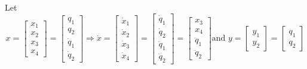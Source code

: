 \documentclass[12pt,a4paper]{article}
\begin{document}
Let 
\[
x = \begin{bmatrix}
	x_1 \\ x_2 \\ x_3 \\ x_4
\end{bmatrix} = \begin{bmatrix}
	q_1 \\ q_2 \\ \dot q_1 \\ \dot q_2
\end{bmatrix} \Rightarrow \dot x = \begin{bmatrix}
	\dot x_1 \\ \dot x_2 \\ \dot x_3 \\ \dot x_4
\end{bmatrix} = \begin{bmatrix}
\dot q_1 \\ \dot q_2 \\ \ddot q_1 \\ \ddot q_2
\end{bmatrix} = \begin{bmatrix}
x_3 \\ x_4 \\ \ddot q_1 \\ \ddot q_2
\end{bmatrix} \text{and } y = \begin{bmatrix}
y_1 \\ y_2 
\end{bmatrix} = \begin{bmatrix}
q_1 \\ q_2
\end{bmatrix}
\]
\end{document}
